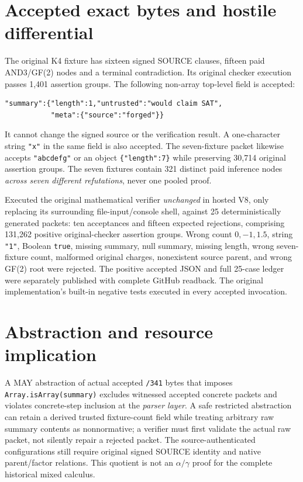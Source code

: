 \documentclass[11pt]{article}
\begin{document}
\section*{Accepted exact bytes and hostile differential}
The original K4 fixture has sixteen signed SOURCE clauses, fifteen paid AND3/GF(2) nodes and a terminal contradiction. Its original checker execution passes 1,401 assertion groups. The following non-array top-level field is accepted:
\begin{verbatim}
"summary":{"length":1,"untrusted":"would claim SAT",
           "meta":{"source":"forged"}}
\end{verbatim}
It cannot change the signed source or the verification result. A one-character string \texttt{"x"} in the same field is also accepted. The seven-fixture packet likewise accepts \texttt{"abcdefg"} or an object \texttt{\{"length":7\}} while preserving 30,714 original assertion groups. The seven fixtures contain 321 distinct paid inference nodes \emph{across seven different refutations}, never one pooled proof.

Executed the original mathematical verifier \emph{unchanged} in hosted V8, only replacing its surrounding file-input/console shell, against 25 deterministically generated packets: ten acceptances and fifteen expected rejections, comprising 131,262 positive original-checker assertion groups. Wrong count $0, -1, 1.5$, string \texttt{"1"}, Boolean \texttt{true}, missing summary, null summary, missing length, wrong seven-fixture count, malformed original charges, nonexistent source parent, and wrong GF(2) root were rejected. The positive accepted JSON and full 25-case ledger were separately published with complete GitHub readback. The original implementation's built-in negative tests executed in every accepted invocation.

\section*{Abstraction and resource implication}
A MAY abstraction of actual accepted \texttt{/341} bytes that imposes \texttt{Array.isArray(summary)} excludes witnessed accepted concrete packets and violates concrete-step inclusion at the \emph{parser layer}. A safe restricted abstraction can retain a derived trusted fixture-count field while treating arbitrary raw summary contents as nonnormative; a verifier must first validate the actual raw packet, not silently repair a rejected packet. The source-authenticated configurations still require original signed SOURCE identity and native parent/factor relations. This quotient is not an $\alpha/\gamma$ proof for the complete historical mixed calculus.
\end{document}
